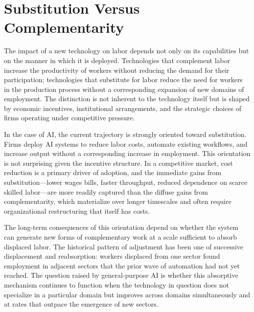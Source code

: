 \documentclass[11pt, a4paper]{article}
\theoremstyle{plain}
\theoremstyle{definition}
\begin{document}
\section{Substitution Versus Complementarity}

The impact of a new technology on labor depends not only on its capabilities
but on the manner in which it is deployed. Technologies that complement labor
increase the productivity of workers without reducing the demand for their
participation; technologies that substitute for labor reduce the need for
workers in the production process without a corresponding expansion of new
domains of employment. The distinction is not inherent to the technology
itself but is shaped by economic incentives, institutional arrangements, and
the strategic choices of firms operating under competitive pressure.

In the case of AI, the current trajectory is strongly oriented toward
substitution. Firms deploy AI systems to reduce labor costs, automate existing
workflows, and increase output without a corresponding increase in employment.
This orientation is not surprising given the incentive structure. In a
competitive market, cost reduction is a primary driver of adoption, and the
immediate gains from substitution---lower wages bills, faster throughput,
reduced dependence on scarce skilled labor---are more readily captured than
the diffuse gains from complementarity, which materialize over longer
timescales and often require organizational restructuring that itself has costs.

The long-term consequences of this orientation depend on whether the system
can generate new forms of complementary work at a scale sufficient to absorb
displaced labor. The historical pattern of adjustment has been one of
successive displacement and reabsorption: workers displaced from one sector
found employment in adjacent sectors that the prior wave of automation had
not yet reached. The question raised by general-purpose AI is whether this
absorptive mechanism continues to function when the technology in question
does not specialize in a particular domain but improves across domains
simultaneously and at rates that outpace the emergence of new sectors.
\end{document}
